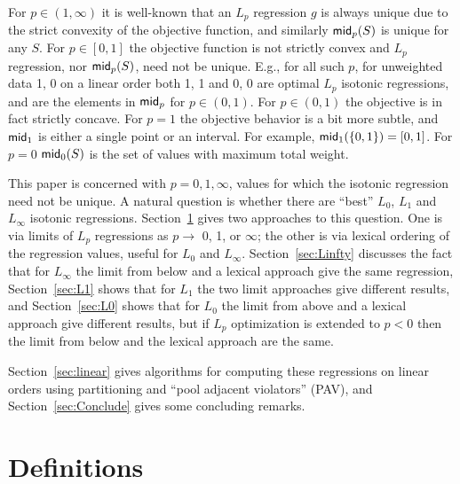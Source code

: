 \documentclass[11pt]{article}
\newcommand{\wmean}[2]{\ensuremath{\mathsf{mid}_{#1}\ifthenelse{\equal{#2}{}}{}{(#2)}}}
\begin{document}
For $p \in (1,\infty)$ it is well-known that an $L_p$ regression $g$ is always unique due to the strict convexity of the objective function, and similarly \wmean{p}{S} is unique for any $S$.
For $p \in [0,1]$  the objective function is not strictly convex and $L_p$ regression, nor \wmean{p}{S}, need not be unique.
E.g., for all such $p$, for unweighted data 1, 0 on a linear order both 1, 1 and 0, 0 are optimal $L_p$ isotonic regressions, and are the elements in \wmean{p}{} for $p \in (0,1)$.
For $p \in (0,1)$ the objective is in fact strictly concave.
For $p=1$ the objective behavior is a bit more subtle, and \wmean{1}{} is either a single point or an interval.
For example, $\wmean{1}{\{0,1\}}= [0,1]$.
For $p=0$ \wmean{0}{S} is the set of values with maximum total weight.

This paper is concerned with $p =0, 1, \infty$, values for which the isotonic regression need not be unique.
A natural question is whether there are ``best'' $L_0$, $L_1$ and $L_\infty$ isotonic regressions.
Section~\ref{sec:definitions} gives two approaches to this question.
One is via limits of $L_p$ regressions as $p \rightarrow $ 0, 1, or $\infty$; the other is via lexical ordering of the regression values, useful for $L_0$ and $L_\infty$.
Section~\ref{sec:Linfty} discusses the fact that for $L_\infty$ the limit from below and a lexical approach give the same regression,
Section~\ref{sec:L1} shows that for $L_1$ the two limit approaches give different results, and
Section~\ref{sec:L0} shows that for $L_0$ the limit from above and a lexical approach give different results, but if $L_p$ optimization is extended to $p<0$ then the limit from below and the lexical approach are the same.

Section~\ref{sec:linear} gives algorithms for computing these regressions on linear orders using partitioning and ``pool adjacent violators'' (PAV), and Section~\ref{sec:Conclude} gives some concluding remarks.



\section{Definitions} \label{sec:definitions}
\end{document}
